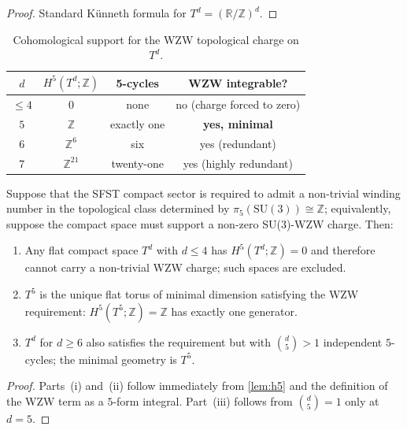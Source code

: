 \begin{proof}
Standard K\"unneth formula for $T^d=(\mathbb{R}/\mathbb{Z})^d$.
\end{proof}

\begin{table}[h]
\centering
\small
\begin{tabular}{cccc}
\toprule
$d$ & $H^5(T^d;\mathbb{Z})$ & 5-cycles & WZW integrable? \\
\midrule
$\leq 4$ & $0$ & none & no (charge forced to zero) \\
$5$ & $\mathbb{Z}$ & exactly one & \textbf{yes, minimal} \\
$6$ & $\mathbb{Z}^6$ & six & yes (redundant) \\
$7$ & $\mathbb{Z}^{21}$ & twenty-one & yes (highly redundant) \\
\bottomrule
\end{tabular}
\caption{Cohomological support for the WZW topological charge on $T^d$.}
\label{tab:wzwcycles}
\end{table}

\begin{proposition}
  \label{prop:d5minimal}
  Suppose that the SFST compact sector is required to admit a
  non-trivial winding number in the topological class determined by
  $\pi_5(\mathrm{SU}(3))\cong\mathbb{Z}$; equivalently, suppose the
  compact space must support a non-zero SU(3)-WZW charge.  Then:
  \begin{enumerate}[label=(\roman*)]
    \item Any flat compact space $T^d$ with $d\leq 4$ has
          $H^5(T^d;\mathbb{Z})=0$ and therefore cannot carry a
          non-trivial WZW charge; such spaces are excluded.
    \item $T^5$ is the unique flat torus of minimal dimension
          satisfying the WZW requirement: $H^5(T^5;\mathbb{Z})=\mathbb{Z}$
          has exactly one generator.
    \item $T^d$ for $d\geq 6$ also satisfies the requirement but with
          $\binom{d}{5}>1$ independent $5$-cycles; the minimal geometry
          is $T^5$.
  \end{enumerate}
\end{proposition}

\begin{proof}
Parts~(i) and~(ii) follow immediately from \cref{lem:h5} and the
definition of the WZW term as a $5$-form integral.
Part~(iii) follows from $\binom{d}{5}=1$ only at $d=5$.
\end{proof}

